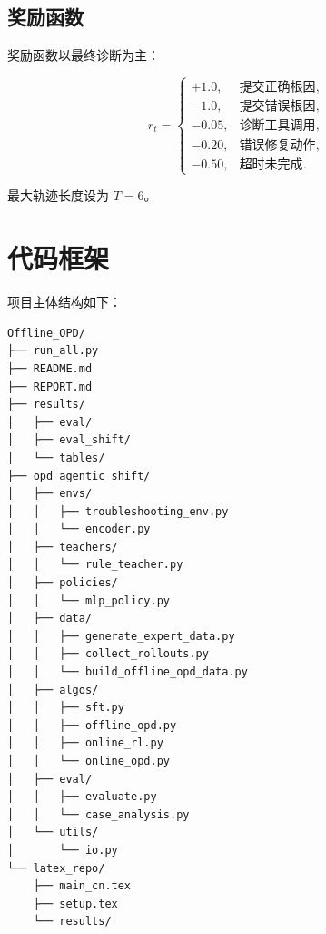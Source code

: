 \documentclass[11pt]{ctexart}
\begin{document}
\subsection{奖励函数}

奖励函数以最终诊断为主：

\begin{equation}
r_t =
\begin{cases}
+1.0, & \text{提交正确根因}, \\
-1.0, & \text{提交错误根因}, \\
-0.05, & \text{诊断工具调用}, \\
-0.20, & \text{错误修复动作}, \\
-0.50, & \text{超时未完成}.
\end{cases}
\end{equation}

最大轨迹长度设为 $T=6$。

\section{代码框架}

项目主体结构如下：

\begin{lstlisting}
Offline_OPD/
├── run_all.py
├── README.md
├── REPORT.md
├── results/
│   ├── eval/
│   ├── eval_shift/
│   └── tables/
├── opd_agentic_shift/
│   ├── envs/
│   │   ├── troubleshooting_env.py
│   │   └── encoder.py
│   ├── teachers/
│   │   └── rule_teacher.py
│   ├── policies/
│   │   └── mlp_policy.py
│   ├── data/
│   │   ├── generate_expert_data.py
│   │   ├── collect_rollouts.py
│   │   └── build_offline_opd_data.py
│   ├── algos/
│   │   ├── sft.py
│   │   ├── offline_opd.py
│   │   ├── online_rl.py
│   │   └── online_opd.py
│   ├── eval/
│   │   ├── evaluate.py
│   │   └── case_analysis.py
│   └── utils/
│       └── io.py
└── latex_repo/
    ├── main_cn.tex
    ├── setup.tex
    └── results/
\end{lstlisting}
\end{document}
